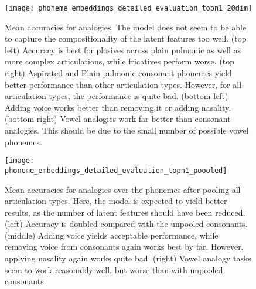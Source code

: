 \documentclass[6pt]{article}
\begin{document}
\begin{figure}[] %
   \centering
   \texttt{[image: phoneme\_embeddings\_detailed\_evaluation\_topn1\_20dim]} 
   \caption{Mean accuracies for analogies. The model does not seem to be able to capture the compositionality of the latent features too well. (top left) Accuracy is best for plosives across plain pulmonic as well as more complex articulations, while fricatives perform worse. (top right) Aspirated and Plain pulmonic consonant phonemes yield better performance than other articulation types. However, for all articulation types, the performance is quite bad. (bottom left) Adding voice works better than removing it or adding nasality. (bottom right) Vowel analogies work far better than consonant analogies. This should be due to the small number of possible vowel phonemes.}
   \label{fig:phoneme_embeddings_detailed_evaluation_topn1}
\end{figure}

\begin{figure}[] %
   \centering
   \texttt{[image: phoneme\_embeddings\_detailed\_evaluation\_topn1\_poooled]} 
   \caption{Mean accuracies for analogies over the phonemes after pooling all articulation types. Here, the model is expected to yield better results, as the number of latent features should have been reduced. (left) Accuracy is doubled compared with the unpooled consonants. (middle) Adding voice yields acceptable performance, while removing voice from consonants again works best by far. However, applying nasality again works quite bad. (right) Vowel analogy tasks seem to work reasonably well, but worse than with unpooled consonants.}
   \label{fig:phoneme_embeddings_detailed_evaluation_topn1_poooled}
\end{figure}
\end{document}
